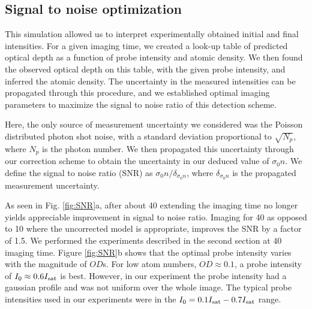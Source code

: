 \documentclass[12pt]{iopart}
\begin{document}
\subsection{Signal to noise optimization}
This simulation allowed us to interpret experimentally obtained initial and final intensities. For a given imaging time, we created a look-up table of predicted optical depth as a function of probe intensity and atomic density. We then found the observed optical depth on this table, with the given probe intensity, and inferred the atomic density. The uncertainty in the measured intensities can be propagated through this procedure, and we established optimal imaging parameters to maximize the signal to noise ratio of this detection scheme. 
\par Here, the only source of measurement uncertainty we considered was the Poisson distributed photon shot noise, with a standard deviation proportional to $\sqrt{N_p}$, where $N_p$ is the photon number. We then propagated this uncertainty through our correction scheme to obtain the uncertainty in our deduced value of $\sigma_0 n$. We define the signal to noise ratio (SNR) as $\sigma_0 n/\delta_{\sigma_0 n}$, where $ \delta_{\sigma_0 n}$ is the propagated measurement uncertainty.
\par As seen in Fig. \ref{fig:SNR}a, after about 40\us{} extending the imaging time no longer yields appreciable improvement in signal to noise ratio. Imaging for 40\us{} as opposed to 10\us{} where the uncorrected model is appropriate, improves the SNR by a factor of  1.5. We performed the experiments described in the second section at 40\us{} imaging time. Figure \ref{fig:SNR}b shows that the optimal probe intensity varies with the magnitude of $OD$s. For low atom numbers, $OD\approx0.1$, a probe intensity of $I_0\approx0.6I_{\rm{sat}}$ is best. However, in our experiment the probe intensity had a gaussian profile and was not uniform over the whole image.  The typical probe intensities used in our experiments were in the $I_0=0.1I_{\rm{sat}}-0.7I_{\rm{sat}}$  range.
\end{document}
